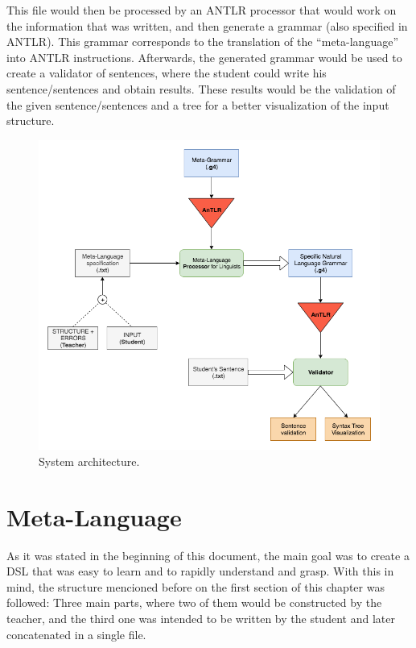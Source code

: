 This file would then be processed by an \textsc{ANTLR} processor that would work on the information that was written, and then generate a grammar (also specified in \textsc{ANTLR}). This grammar corresponds to the translation of the ``meta-language'' into \textsc{ANTLR} instructions. Afterwards, the generated grammar would be used to create a validator of sentences, where the student could write his sentence/sentences and obtain results. These results would be the validation of the given sentence/sentences and a tree for a better visualization of the input structure.

\begin{figure}[h]
    \centering
    \includegraphics[width=12cm]{images/msc_system_architecture.png}
    \caption{System architecture.}
    \label{fig:system_architecture}
\end{figure}

\section{Meta-Language}
As it was stated in the beginning of this document, the main goal was to create a \textsc{DSL} that was easy to learn and to rapidly understand and grasp. With this in mind, the structure mencioned before on the first section of this chapter was followed: Three main parts, where two of them would be constructed by the teacher, and the third one was intended to be written by the student and later concatenated in a single file.

